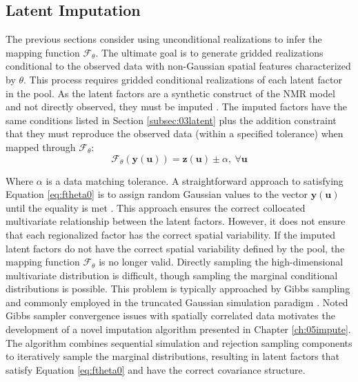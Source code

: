 \FloatBarrier
\subsection{Latent Imputation}
\label{subsec:03impute}

The previous sections consider using unconditional realizations to infer the mapping function $\mathcal{F}_{\theta}$. The ultimate goal is to generate gridded realizations conditional to the observed data with non-Gaussian spatial features characterized by $\theta$. This process requires gridded conditional realizations of each latent factor in the pool. As the latent factors are a synthetic construct of the \gls{NMR} model and not directly observed, they must be imputed \citep{little2019statistical}. The imputed factors have the same conditions listed in Section \ref{subsec:03latent} plus the addition constraint that they must reproduce the observed data (within a specified tolerance) when mapped through $\mathcal{F}_{\theta}$:
\begin{equation}
    \mathcal{F}_{\theta}(\mathbf{y}(\mathbf{u})) = \mathbf{z}(\mathbf{u}) \pm \alpha, \ \forall \mathbf{u}
    \label{eq:ftheta0}
\end{equation}

Where $\alpha$ is a data matching tolerance. A straightforward approach to satisfying Equation \ref{eq:ftheta0} is to assign random Gaussian values to the vector $\mathbf{y}(\mathbf{u})$ until the equality is met \citep{silva2018enhanced}. This approach ensures the correct collocated multivariate relationship between the latent factors. However, it does not ensure that each regionalized factor has the correct spatial variability. If the imputed latent factors do not have the correct spatial variability defined by the pool, the mapping function $\mathcal{F}_{\theta}$ is no longer valid. Directly sampling the high-dimensional multivariate distribution is difficult, though sampling the marginal conditional distributions is possible. This problem is typically approached by Gibbs sampling \citep{geman1984stochastic} and commonly employed in the truncated Gaussian simulation paradigm \citep{arroyo2020iterative,madani2021enhanced}. Noted Gibbs sampler convergence issues with spatially correlated data motivates the development of a novel imputation algorithm presented in Chapter \ref{ch:05impute}. The algorithm combines sequential simulation and rejection sampling components to iteratively sample the marginal distributions, resulting in latent factors that satisfy Equation \ref{eq:ftheta0} and have the correct covariance structure.

